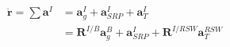 



\begin{equation}
    \begin{aligned}
        \ddot{\mathbf{r}} = \sum{\mathbf{a}}^I &=\mathbf{a}_g^I + \mathbf{a}_{SRP}^I + \mathbf{a}_T^I\\
        &= \mathbf{R}^{I/B}\mathbf{a}_g^{B} + \mathbf{a}_{SRP}^I + \mathbf{R}^{I/RSW}\mathbf{a}_T^{RSW}
    \end{aligned}
\end{equation}

